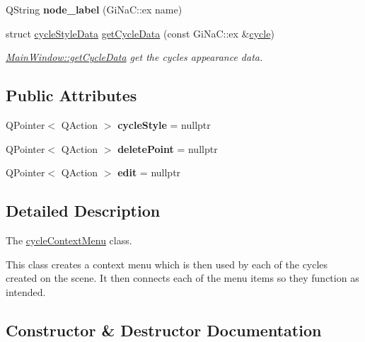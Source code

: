 \begin{DoxyCompactItemize}
\mbox{\label{classcycle_context_menu_a17d519c784fac28e39da31478b810ae9}} 
Q\+String {\bfseries node\+\_\+label} (Gi\+Na\+C\+::ex name)
\item 
struct \mbox{\hyperlink{structcycle_style_data}{cycle\+Style\+Data}} \mbox{\hyperlink{classcycle_context_menu_ae9e820ae7baf504c5229592a0901a12c}{get\+Cycle\+Data}} (const Gi\+Na\+C\+::ex \&\mbox{\hyperlink{class_moeb_inv_1_1cycle}{cycle}})
\begin{DoxyCompactList}\small\item\em \mbox{\hyperlink{class_main_window_a3088b7addf938e91e77b741a9ae22a53}{Main\+Window\+::get\+Cycle\+Data}} get the cycles appearance data. \end{DoxyCompactList}\end{DoxyCompactItemize}
\subsection*{Public Attributes}
\begin{DoxyCompactItemize}
\item 
\mbox{\label{classcycle_context_menu_a4b36e4536f222fdc21f02fd787782423}} 
Q\+Pointer$<$ Q\+Action $>$ {\bfseries cycle\+Style} = nullptr
\item 
\mbox{\label{classcycle_context_menu_aa58c68008bb6ab0d70af517821b8a48f}} 
Q\+Pointer$<$ Q\+Action $>$ {\bfseries delete\+Point} = nullptr
\item 
\mbox{\label{classcycle_context_menu_a7c9b8d13930dc91c050e5b870f7dbfb8}} 
Q\+Pointer$<$ Q\+Action $>$ {\bfseries edit} = nullptr
\end{DoxyCompactItemize}


\subsection{Detailed Description}
The \mbox{\hyperlink{classcycle_context_menu}{cycle\+Context\+Menu}} class. 

This class creates a context menu which is then used by each of the cycles created on the scene. It then connects each of the menu items so they function as intended. 

\subsection{Constructor \& Destructor Documentation}
\mbox{\label{classcycle_context_menu_a0a948765494ab4b2ecf73c89123f7f14}} 
